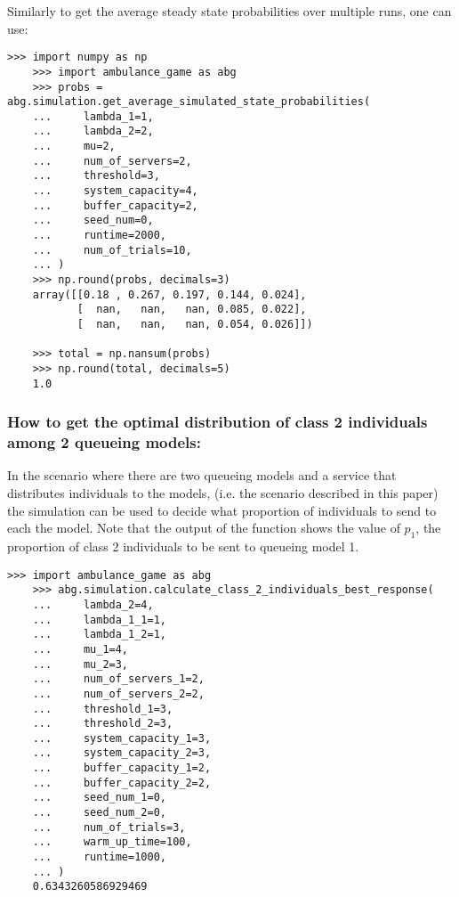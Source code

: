 Similarly to get the average steady state probabilities over multiple runs,
one can use:

\begin{lstlisting}[style=pystyle]
    >>> import numpy as np
    >>> import ambulance_game as abg
    >>> probs = abg.simulation.get_average_simulated_state_probabilities(
    ...     lambda_1=1,
    ...     lambda_2=2,
    ...     mu=2,
    ...     num_of_servers=2,
    ...     threshold=3,
    ...     system_capacity=4,
    ...     buffer_capacity=2,
    ...     seed_num=0,
    ...     runtime=2000,
    ...     num_of_trials=10,
    ... )
    >>> np.round(probs, decimals=3)
    array([[0.18 , 0.267, 0.197, 0.144, 0.024],
           [  nan,   nan,   nan, 0.085, 0.022],
           [  nan,   nan,   nan, 0.054, 0.026]])
    
    >>> total = np.nansum(probs)
    >>> np.round(total, decimals=5)
    1.0

\end{lstlisting}


\subsubsection{How to get the optimal distribution of class 2 individuals among 2 
queueing models:}

In the scenario where there are two queueing models and a service that 
distributes individuals to the models, (i.e. the scenario described in this 
paper) the simulation can be used to decide what proportion of individuals 
to send to each the model.
Note that the output of the function shows the value of \(p_1\), the proportion
of class 2 individuals to be sent to queueing model 1. 

\begin{lstlisting}[style=pystyle]
    >>> import ambulance_game as abg
    >>> abg.simulation.calculate_class_2_individuals_best_response(
    ...     lambda_2=4,
    ...     lambda_1_1=1,
    ...     lambda_1_2=1,
    ...     mu_1=4,
    ...     mu_2=3,
    ...     num_of_servers_1=2,
    ...     num_of_servers_2=2,
    ...     threshold_1=3,
    ...     threshold_2=3,
    ...     system_capacity_1=3,
    ...     system_capacity_2=3,
    ...     buffer_capacity_1=2,
    ...     buffer_capacity_2=2,
    ...     seed_num_1=0,
    ...     seed_num_2=0,
    ...     num_of_trials=3,
    ...     warm_up_time=100,
    ...     runtime=1000,
    ... )
    0.6343260586929469

\end{lstlisting}


